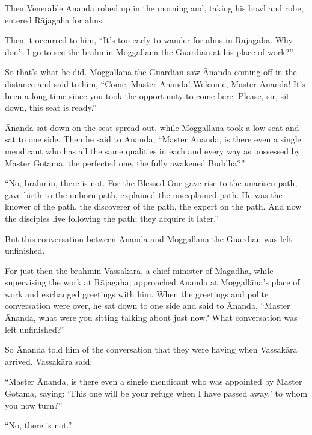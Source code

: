 \documentclass[12pt,openany]{book}%
\begin{document}
Then Venerable Ānanda robed up in the morning and, taking his bowl and robe, entered \textsanskrit{Rājagaha} for alms. 

Then it occurred to him, “It’s too early to wander for alms in \textsanskrit{Rājagaha}. Why don’t I go to see the brahmin \textsanskrit{Moggallāna} the Guardian at his place of work?” 

So that’s what he did. \textsanskrit{Moggallāna} the Guardian saw Ānanda coming off in the distance and said to him, “Come, Master Ānanda! Welcome, Master Ānanda! It’s been a long time since you took the opportunity to come here. Please, sir, sit down, this seat is ready.” 

Ānanda sat down on the seat spread out, while \textsanskrit{Moggallāna} took a low seat and sat to one side. Then he said to Ānanda, “Master Ānanda, is there even a single mendicant who has all the same qualities in each and every way as possessed by Master Gotama, the perfected one, the fully awakened Buddha?” 

“No, brahmin, there is not. For the Blessed One gave rise to the unarisen path, gave birth to the unborn path, explained the unexplained path. He was the knower of the path, the discoverer of the path, the expert on the path. And now the disciples live following the path; they acquire it later.” 

But this conversation between Ānanda and \textsanskrit{Moggallāna} the Guardian was left unfinished. 

For just then the brahmin \textsanskrit{Vassakāra}, a chief minister of Magadha, while supervising the work at \textsanskrit{Rājagaha}, approached Ānanda at \textsanskrit{Moggallāna}’s place of work and exchanged greetings with him. When the greetings and polite conversation were over, he sat down to one side and said to Ānanda, “Master Ānanda, what were you sitting talking about just now? What conversation was left unfinished?” 

So Ānanda told him of the conversation that they were having when \textsanskrit{Vassakāra} arrived. \textsanskrit{Vassakāra} said: 

“Master Ānanda, is there even a single mendicant who was appointed by Master Gotama, saying: ‘This one will be your refuge when I have passed away,’ to whom you now turn?” 

“No, there is not.” 
\end{document}
